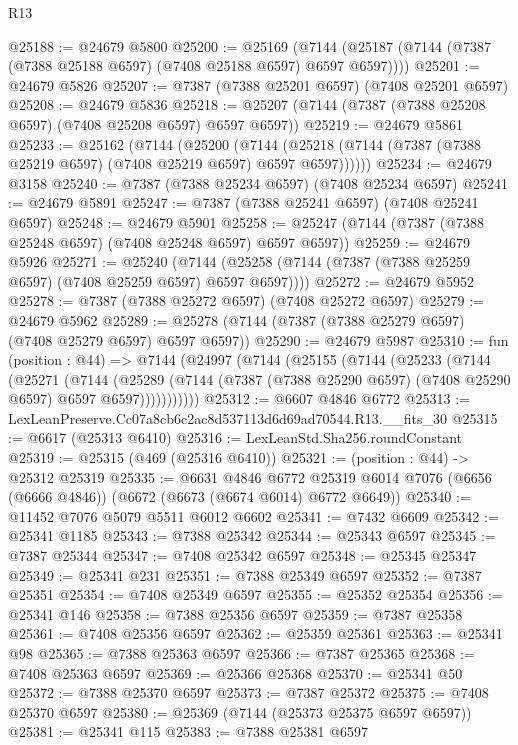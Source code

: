 \begin{lexlean}{R13}
\begin{coremodule}
@25188 := @24679 @5800
@25200 := @25169
    (@7144 (@25187 (@7144 (@7387 (@7388 @25188 @6597) (@7408 @25188 @6597) @6597 @6597))))
@25201 := @24679 @5826
@25207 := @7387 (@7388 @25201 @6597) (@7408 @25201 @6597)
@25208 := @24679 @5836
@25218 := @25207 (@7144 (@7387 (@7388 @25208 @6597) (@7408 @25208 @6597) @6597 @6597))
@25219 := @24679 @5861
@25233 := @25162
    (@7144
      (@25200
        (@7144 (@25218 (@7144 (@7387 (@7388 @25219 @6597) (@7408 @25219 @6597) @6597 @6597))))))
@25234 := @24679 @3158
@25240 := @7387 (@7388 @25234 @6597) (@7408 @25234 @6597)
@25241 := @24679 @5891
@25247 := @7387 (@7388 @25241 @6597) (@7408 @25241 @6597)
@25248 := @24679 @5901
@25258 := @25247 (@7144 (@7387 (@7388 @25248 @6597) (@7408 @25248 @6597) @6597 @6597))
@25259 := @24679 @5926
@25271 := @25240
    (@7144 (@25258 (@7144 (@7387 (@7388 @25259 @6597) (@7408 @25259 @6597) @6597 @6597))))
@25272 := @24679 @5952
@25278 := @7387 (@7388 @25272 @6597) (@7408 @25272 @6597)
@25279 := @24679 @5962
@25289 := @25278 (@7144 (@7387 (@7388 @25279 @6597) (@7408 @25279 @6597) @6597 @6597))
@25290 := @24679 @5987
@25310 := fun (position : @44) =>
  @7144
    (@24997
      (@7144
        (@25155
          (@7144
            (@25233
              (@7144
                (@25271
                  (@7144
                    (@25289
                      (@7144 (@7387 (@7388 @25290 @6597) (@7408 @25290 @6597) @6597 @6597)))))))))))
@25312 := @6607 @4846 @6772
@25313 := LexLeanPreserve.Cc07a8cb6c2ac8d537113d6d69ad70544.R13.__fits_30
@25315 := @6617 (@25313 @6410)
@25316 := LexLeanStd.Sha256.roundConstant
@25319 := @25315 (@469 (@25316 @6410))
@25321 := (position : @44) -> @25312 @25319
@25335 := @6631
    @4846
    @6772
    @25319
    @6014
    @7076
    (@6656 (@6666 @4846))
    (@6672 (@6673 (@6674 @6014) @6772 @6649))
@25340 := @11452 @7076 @5079 @5511 @6012 @6602
@25341 := @7432 @6609
@25342 := @25341 @1185
@25343 := @7388 @25342
@25344 := @25343 @6597
@25345 := @7387 @25344
@25347 := @7408 @25342 @6597
@25348 := @25345 @25347
@25349 := @25341 @231
@25351 := @7388 @25349 @6597
@25352 := @7387 @25351
@25354 := @7408 @25349 @6597
@25355 := @25352 @25354
@25356 := @25341 @146
@25358 := @7388 @25356 @6597
@25359 := @7387 @25358
@25361 := @7408 @25356 @6597
@25362 := @25359 @25361
@25363 := @25341 @98
@25365 := @7388 @25363 @6597
@25366 := @7387 @25365
@25368 := @7408 @25363 @6597
@25369 := @25366 @25368
@25370 := @25341 @50
@25372 := @7388 @25370 @6597
@25373 := @7387 @25372
@25375 := @7408 @25370 @6597
@25380 := @25369 (@7144 (@25373 @25375 @6597 @6597))
@25381 := @25341 @115
@25383 := @7388 @25381 @6597

\end{coremodule}
\end{lexlean}
